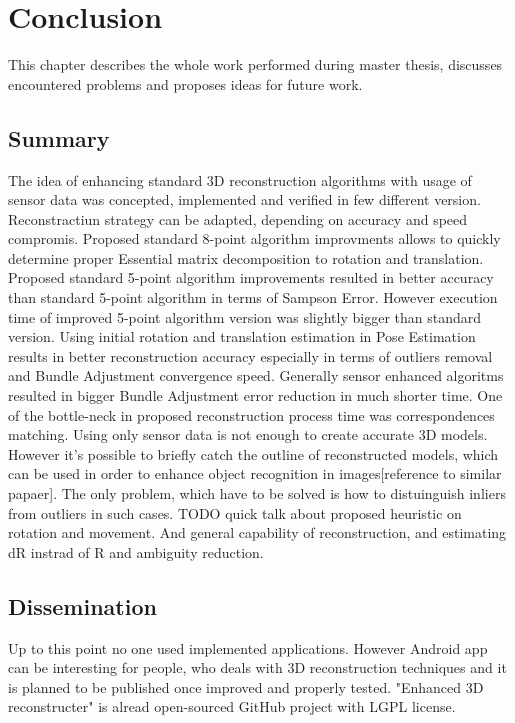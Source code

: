 
\chapter{Conclusion} %
This chapter describes the whole work performed during master thesis, discusses encountered problems and proposes ideas for future work.

\section{Summary}
The idea of enhancing standard 3D reconstruction algorithms with usage of sensor data was concepted, implemented and verified in few different version. Reconstractiun strategy can be adapted, depending on accuracy and speed compromis. Proposed standard 8-point algorithm improvments allows to quickly determine proper Essential matrix decomposition to rotation and translation. Proposed standard 5-point algorithm improvements resulted in better accuracy than standard 5-point algorithm in terms of Sampson Error. However execution time of improved 5-point algorithm version was slightly bigger than standard version. Using initial rotation and translation estimation in Pose Estimation results in better reconstruction accuracy especially in terms of outliers removal and Bundle Adjustment convergence speed. Generally sensor enhanced algoritms resulted in bigger Bundle Adjustment error reduction in much shorter time. One of the bottle-neck in proposed reconstruction process time was correspondences matching. Using only sensor data is not enough to create accurate 3D models. However it's possible to briefly catch the outline of reconstructed models, which can be used in order to enhance object recognition in images[reference to similar papaer]. The only problem, which have to be solved is how to distuinguish inliers from outliers in such cases. TODO quick talk about proposed heuristic on rotation and movement. And general capability of reconstruction, and estimating dR instrad of R and ambiguity reduction.    
\section{Dissemination}
Up to this point no one used implemented applications. However Android app can be interesting for people, who deals with 3D reconstruction techniques and it is planned to be published once improved and properly tested. "Enhanced 3D reconstructer" is alread open-sourced GitHub project with LGPL license.

